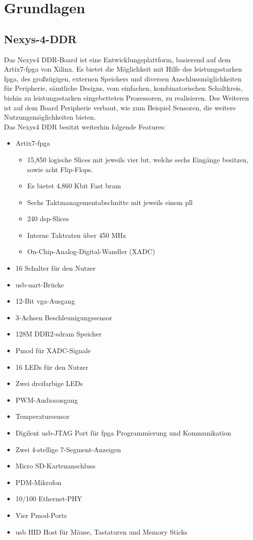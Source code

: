 \chapter{Grundlagen}\label{kap:grundlagen}


\section{Nexys-4-DDR}\label{kap:nexys4}
Das Nexys4 DDR-Board ist eine Entwicklungsplattform, basierend auf dem Artix7-\ac{fpga}
von Xilinx. Es bietet die Möglichkeit mit Hilfe des leistungsstarken \ac{fpga}, des großzügigen, externen Speichers und diversen Anschlussmöglichkeiten
für Peripherie, sämtliche Designs, vom einfachen, kombinatorischen Schaltkreis, bishin zu leistungsstarken eingebetteten Prozessoren, zu realisieren.
Des Weiteren ist auf dem Board Peripherie verbaut, wie zum Beispiel Sensoren, die weitere Nutzungsmöglichkeiten bieten.\\
Das Nexys4 DDR besitzt weiterhin folgende Features:~\cite{digilent}\\
\begin{itemize}
  \item Artix7-\ac{fpga}
\begin{itemize}
  \item 15,850 logische Slices mit jeweils vier \ac{lut}, welche sechs Eingänge besitzen, sowie acht Flip-Flops.
  \item Es bietet 4,860 Kbit Fast \ac{bram}
  \item Sechs Taktmanagementabschnitte mit jeweils einem \ac{pll}
  \item 240 \ac{dsp}-Slices
  \item Interne Taktraten über 450 MHz
  \item On-Chip-Analog-Digital-Wandler (XADC)
\end{itemize}
  \item 16 Schalter für den Nutzer
  \item \ac{usb}-\ac{uart}-Brücke
  \item 12-Bit \ac{vga}-Ausgang
  \item 3-Achsen Beschleunigungssensor
  \item 128M DDR2-\ac{sdram} Speicher
  \item Pmod für XADC-Signale
  \item 16 LEDs für den Nutzer
  \item Zwei dreifarbige LEDs
  \item PWM-Audioausgang
  \item Temperatursensor
  \item Digilent \ac{usb}-JTAG Port für \ac{fpga} Programmierung und Kommunikation
  \item Zwei 4-stellige 7-Segment-Anzeigen
  \item Micro SD-Kartenanschluss
  \item PDM-Mikrofon
  \item 10/100 Ethernet-PHY
  \item Vier Pmod-Ports
  \item \ac{usb} HID Host für Mäuse, Tastaturen und Memory Sticks

\end{itemize}


